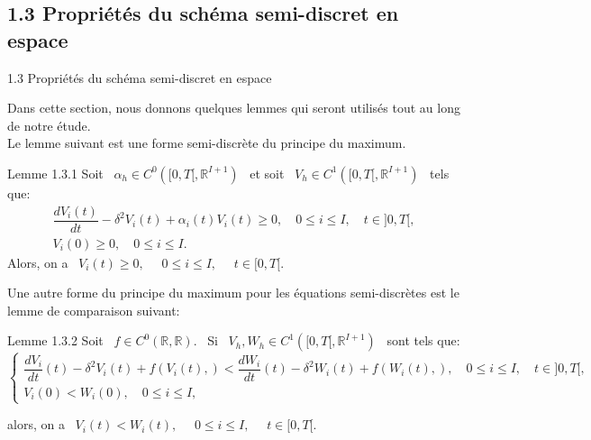 \documentclass[10pt]{beamer}
\begin{document}
\begin{frame}
\subsection{1.3 Propriétés du schéma semi-discret en espace}
\begin{block}{1.3  Propriétés du schéma semi-discret en espace}\end{block}
Dans cette section, nous donnons quelques lemmes qui seront utilisés tout au long de notre étude.\\
  Le lemme suivant est une forme semi-discrète du principe du maximum.\\
    \begin{block}{Lemme 1.3.1}
    Soit \ $\alpha_h \in C^0\left([0,T[,\mathbb{R}^{I+1}\right)$ \ et soit \ $V_h \in C^1\left([0,T[,\mathbb{R}^{I+1}\right)$ \ tels que:\\
     \begin{eqnarray}
    \dfrac{dV_i(t)}{dt}-\delta^2V_i(t)+\alpha_i(t)V_i(t)\geqslant 0,\quad 0\leqslant i\leqslant I,\quad t\in ]0,T[,\\ 
		V_i(0)\geqslant 0,\quad 0\leqslant i\leqslant I.
    \end{eqnarray}
   Alors, on a \ $V_i(t)\geqslant 0,$ \ \ $0\leqslant i\leqslant I ,$ \ \ $t\in [0,T[.$  \
    \end{block}
\end{frame}
 \begin{frame}
       Une autre forme du principe du maximum pour les équations semi-discrètes est le lemme de comparaison suivant:\\
    
 \begin{block}{Lemme 1.3.2}
    Soit \ $f\in C^0( \mathbb{R},\mathbb{R}).$ \ Si \ $V_h, W_h \in C^1\left([0,T[,\mathbb{R}^{I+1}\right)$ \ sont tels que:
    \begin{equation} 
 \begin{cases} 
  \dfrac{dV_i}{dt}(t)-\delta^2V_i(t)+f\left(V_i(t),\right)< \dfrac{dW_i}{dt}(t)-\delta^2W_i(t)+f\left(W_i(t),\right),\quad 0\leqslant i\leqslant I,\quad t\in ]0,T[,\\ 
			V_i(0)< W_i(0),\quad 0\leqslant i\leqslant I,
     \end{cases}
 \end{equation}
   
    alors, on a \ $ V_i(t)< W_i(t),$ \ \ $ 0\leqslant i\leqslant I ,$ \ \ $t\in [0,T[.$ \
 \end{block}
 \end{frame}
\end{document}
